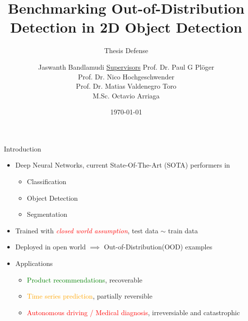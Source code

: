 \documentclass[10pt, aspectratio=169]{beamer}
\author[Jaswanth]{Jaswanth Bandlamudi \newline \newline \underline{Supervisors} \newline \vfill Prof. Dr. Paul G Pl\"{o}ger\\Prof. Dr. Nico Hochgeschwender \\ Prof. Dr. Matias Valdenegro Toro \\ M.Sc. Octavio Arriaga}
\title{Benchmarking Out-of-Distribution Detection in 2D Object Detection}
\subtitle{Thesis Defense}
\institute[HBRS]{Hochschule Bonn-Rhein-Sieg}
\date{\today}
\begin{document}
\setlength{\parskip}{1em}
\renewcommand{\baselinestretch}{1.25}
{
\begin{frame}
\titlepage
\end{frame}
}

\setlength\abovecaptionskip{-5pt}

\begin{frame}{Introduction}
\begin{itemize}
    \item Deep Neural Networks, current State-Of-The-Art (SOTA) performers in 
    \begin{itemize}
        \item Classification
        \item Object Detection
        \item Segmentation
    \end{itemize} 

    \item Trained with \textcolor{red}{\textit{closed world assumption}}, test data $\sim$ train data
    \item Deployed in open world $\implies$ Out-of-Distribution(OOD) examples
    \item Applications
        \begin{itemize}
            \item \textcolor{green}{Product recommendations}, recoverable
            \item \textcolor{orange}{Time series prediction}, partially reversible
            \item \textcolor{red}{Autonomous driving / Medical diagnosis}, irreversiable and catastrophic
        \end{itemize}
\end{itemize}
\end{frame}
\end{document}
